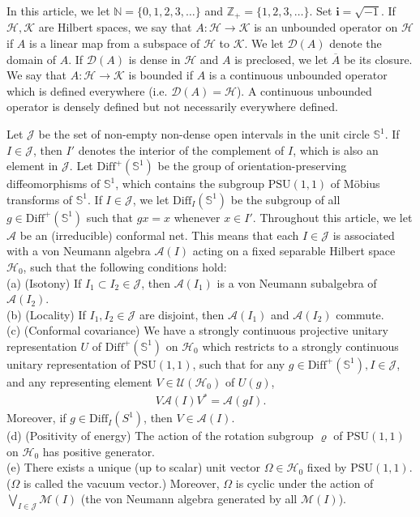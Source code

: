\documentclass[12pt,a4paper]{article}
\theoremstyle{definition}
\theoremstyle{plain}
\newcommand{\mc}{\mathcal}
\newcommand{\ovl}{\overline}
\newcommand{\Dom}{\scr D}
\newcommand{\Diffp}{\mathrm{Diff}^+}
\newcommand{\Diff}{\mathrm{Diff}}
\newcommand{\PSU}{\mathrm{PSU}(1,1)}
\newcommand{\scr}{\mathscr}
\newcommand{\im}{\mathbf{i}}
\newcommand{\mbb}{\mathbb}
\numberwithin{equation}{subsection}
\begin{document}
In this article, we let $\mbb N=\{0,1,2,3,\dots\}$ and $\mbb Z_+=\{1,2,3,\dots\}$. Set $\im=\sqrt{-1}$. If $\mc H,\mc K$ are Hilbert spaces, we say that  $A:\mc H\rightarrow\mc K$ is an unbounded operator on $\mc H$ if $A$ is a linear map from a subspace of $\mc H$ to $\mc K$. We let $\Dom(A)$ denote the domain of $A$. If $\Dom(A)$ is dense in $\mc H$ and $A$ is preclosed, we let $\ovl A$ be its closure. We say that $A:\mc H\rightarrow\mc K$ is bounded if $A$ is a continuous unbounded operator which is  defined everywhere (i.e. $\Dom(A)=\mc H$). A continuous unbounded operator is densely defined but not necessarily everywhere defined.

Let $\mc J$ be the set of non-empty non-dense open intervals in the unit circle $\mbb S^1$. If $I\in\mc J$, then $I'$ denotes the interior of the complement of $I$, which is also an element in $\mc J$. Let $\Diffp(\mbb S^1)$ be the group of orientation-preserving diffeomorphisms of $\mbb S^1$, which contains the subgroup $\PSU$ of M\"obius transforms of $\mbb S^1$. If $I\in\mc J$, we let $\Diff_I(\mbb S^1)$ be the subgroup of all $g\in\Diffp(\mbb S^1)$ such that $gx=x$ whenever $x\in I'$. Throughout this article, we let $\mc A$ be an (irreducible) conformal net. This means that each $I\in\mathcal J$ is associated with a von Neumann algebra $\mathcal A(I)$ acting on a fixed separable Hilbert space $\mathcal H_0$, such that the following conditions hold:\\
(a) (Isotony) If $I_1\subset I_2\in\mathcal J$, then $\mathcal A(I_1)$ is a von Neumann subalgebra of $\mathcal A(I_2)$.\\
(b) (Locality) If $I_1,I_2\in\mathcal J$ are disjoint, then $\mathcal A(I_1)$ and $\mathcal A(I_2)$ commute.\\
(c) (Conformal covariance) We have a strongly continuous projective unitary representation $U$ of $\Diffp(\mbb S^1)$ on $\mathcal H_0$ which restricts to a strongly continuous unitary representation of $\PSU$, such that for any $g\in \Diffp(\mbb S^1),I\in\mathcal J$, and any representing element $V\in\mathcal U(\mathcal H_0)$ of $U(g)$,
\begin{align*}
V\mathcal A(I)V^*=\mathcal A(gI).
\end{align*}
Moreover, if $g\in\Diff_I(S^1)$, then $V\in\mc A(I)$.\\
(d) (Positivity of energy) The action of the rotation subgroup $\varrho$ of $\PSU$ on $\mc H_0$ has positive generator.\\
(e) There exists a  unique (up to scalar) unit vector $\Omega\in\mathcal H_0$ fixed by $\PSU$. ($\Omega$ is called the vacuum vector.) Moreover, $\Omega$ is  cyclic under the action of $\bigvee_{I\in\mathcal J}\mathcal M(I)$ (the von Neumann algebra generated by all $\mathcal M(I)$).
\end{document}
